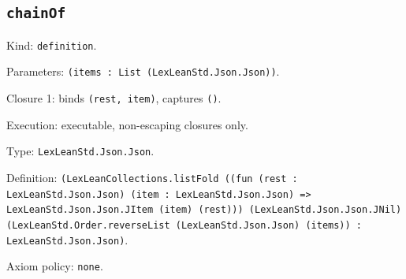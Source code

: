 \documentclass[11pt]{article}
\begin{document}
\subsection*{\texttt{chainOf}}
\noindent Kind: \texttt{definition}.\par
\noindent Parameters: \texttt{(items : List (LexLeanStd.Json.Json))}.\par
\noindent Closure 1: binds \texttt{(rest, item)}, captures \texttt{()}.\par
\noindent Execution: executable, non-escaping closures only.\par
\noindent Type: \texttt{LexLeanStd.Json.Json}.\par
\noindent Definition: \texttt{(LexLeanCollections.listFold ((fun (rest : LexLeanStd.Json.Json) (item : LexLeanStd.Json.Json) => LexLeanStd.Json.Json.JItem (item) (rest))) (LexLeanStd.Json.Json.JNil) (LexLeanStd.Order.reverseList (LexLeanStd.Json.Json) (items)) : LexLeanStd.Json.Json)}.\par
\noindent Axiom policy: \texttt{none}.\par
\end{document}
